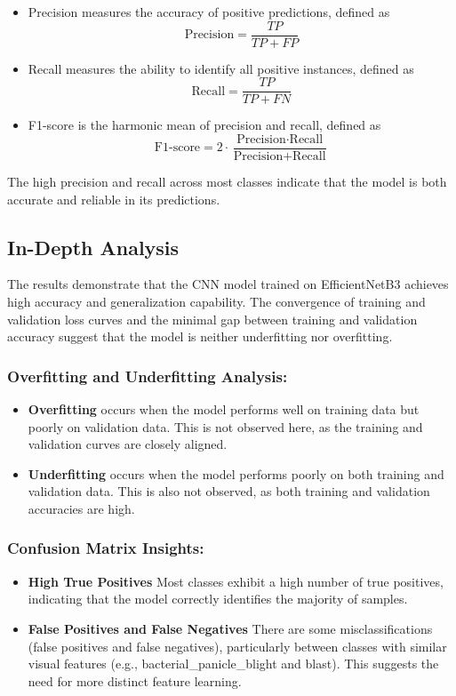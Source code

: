 \documentclass[conference]{IEEEtran}
\begin{document}
\begin{itemize}
    \item Precision measures the accuracy of positive predictions, defined as 
    \[
    \text{Precision} = \frac{TP}{TP + FP}
    \]
    \item Recall measures the ability to identify all positive instances, defined as 
    \[
    \text{Recall} = \frac{TP}{TP + FN}
    \]
    \item F1-score is the harmonic mean of precision and recall, defined as 
    \[
    \text{F1-score} = 2 \cdot \frac{\text{Precision} \cdot \text{Recall}}{\text{Precision} + \text{Recall}}
    \]
\end{itemize}

The high precision and recall across most classes indicate that the model is both accurate and reliable in its predictions.

\subsection{In-Depth Analysis}
The results demonstrate that the CNN model trained on EfficientNetB3 achieves high accuracy and generalization capability. The convergence of training and validation loss curves and the minimal gap between training and validation accuracy suggest that the model is neither underfitting nor overfitting.

\subsubsection{Overfitting and Underfitting Analysis:}
\begin{itemize}
    \item \textbf{Overfitting} occurs when the model performs well on training data but poorly on validation data. This is not observed here, as the training and validation curves are closely aligned.
    \item \textbf{Underfitting} occurs when the model performs poorly on both training and validation data. This is also not observed, as both training and validation accuracies are high.
\end{itemize}

\subsubsection{Confusion Matrix Insights:}
\begin{itemize}
    \item \textbf{High True Positives} Most classes exhibit a high number of true positives, indicating that the model correctly identifies the majority of samples.
    \item \textbf{False Positives and False Negatives} There are some misclassifications (false positives and false negatives), particularly between classes with similar visual features (e.g., bacterial\_panicle\_blight and blast). This suggests the need for more distinct feature learning.
\end{itemize}
\end{document}
